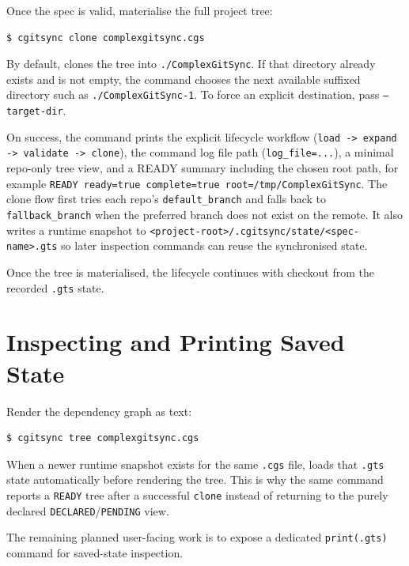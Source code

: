 Once the spec is valid, materialise the full project tree:

\begin{lstlisting}[language=bash]
$ cgitsync clone complexgitsync.cgs
\end{lstlisting}

By default, \cgscli{} clones the tree into \texttt{./ComplexGitSync}. If that
directory already exists and is not empty, the command chooses the next
available suffixed directory such as \texttt{./ComplexGitSync-1}. To force an
explicit destination, pass \texttt{--target-dir}.

On success, the command prints the explicit lifecycle workflow
(\texttt{load -> expand -> validate -> clone}), the command log file path
(\texttt{log\_file=...}), a minimal repo-only tree view, and a READY summary
including the chosen root path, for example
\texttt{READY ready=true complete=true root=/tmp/ComplexGitSync}.
The clone flow first tries each repo's \texttt{default\_branch} and falls back
to \texttt{fallback\_branch} when the preferred branch does not exist on the
remote. It also writes a runtime snapshot to
\texttt{<project-root>/.cgitsync/state/<spec-name>.gts} so later inspection
commands can reuse the synchronised state.

Once the tree is materialised, the lifecycle continues with checkout from the
recorded \texttt{.gts} state.

\section{Inspecting and Printing Saved State}

Render the dependency graph as text:

\begin{lstlisting}[language=bash]
$ cgitsync tree complexgitsync.cgs
\end{lstlisting}

When a newer runtime snapshot exists for the same \texttt{.cgs} file,
\cgscli{} loads that \texttt{.gts} state automatically before rendering the
tree. This is why the same command reports a \texttt{READY} tree after a
successful \texttt{clone} instead of returning to the purely declared
\texttt{DECLARED}/\texttt{PENDING} view.

The remaining planned user-facing work is to expose a dedicated
\texttt{print(.gts)} command for saved-state inspection.

